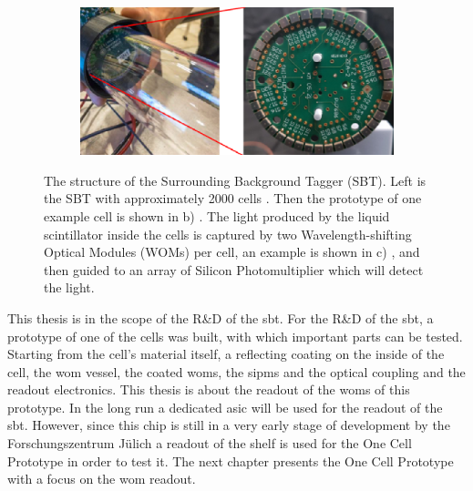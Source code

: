 \begin{figure}
\begin{subfigure}[b]{0.24\textwidth}
		\caption{}
		\label{fig:sbt_structure_cell}
	\end{subfigure}
	\begin{subfigure}[b]{0.42\textwidth}
		\centering
		\includegraphics[width=1.\textwidth]{pictures/sbt_structure_wom}
		\caption{}
		\label{fig:sbt_structure}
	\end{subfigure}
	\caption[Overview of the Surrounding Background Tagger]{The structure of the Surrounding Background Tagger (SBT). Left is the SBT with approximately 2000 cells \cite{}. Then the prototype of one example cell is shown in b) \cite{}. The light produced by the liquid scintillator inside the cells is captured by two Wavelength-shifting Optical Modules (WOMs) per cell, an example is shown in c) \cite{}, and then guided to an array of Silicon Photomultiplier which will detect the light.}
 	\label{fig:sbt}
\end{figure}

This thesis is in the scope of the R\&D of the \ac{sbt}.
For the R\&D of the \ac{sbt}, a prototype of one of the cells was built, with which important parts can be tested.
Starting from the cell's material itself, a reflecting coating on the inside of the cell, the \ac{wom} vessel, the coated \acp{wom}, the \acp{sipm} and the optical coupling and the readout electronics.
This thesis is about the readout of the \acp{wom} of this prototype.
In the long run a dedicated \ac{asic} will be used for the readout of the \ac{sbt}.
However, since this chip is still in a very early stage of development by the Forschungszentrum Jülich a readout of the shelf is used for the One Cell Prototype in order to test it.
The next chapter presents the One Cell Prototype with a focus on the \ac{wom} readout.
